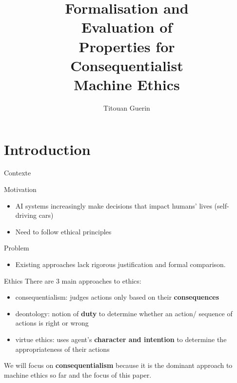 \documentclass[compress,xcolor=table]{beamer}
\title{\Huge Formalisation and\\Evaluation of\\Properties for\\Consequentialist\\Machine Ethics}
\subtitle{} %
\date{\formatdate{16}{05}{2024}}
\author{Titouan Guerin}
\begin{document}
\begin{frame}[plain]
	\titlepage
	\setcounter{framenumber}{0}
\end{frame}

\section{Introduction}

\begin{frame}{Contexte}

    \begin{block}{Motivation}
        \begin{itemize}
            \item AI systems increasingly make decisions that impact humans’ lives (self-driving cars)
            \item Need to follow ethical principles
        \end{itemize}
    \end{block}
    \pause
    \begin{block}{Problem}
        \begin{itemize}
            \item Existing approaches lack rigorous justification and formal comparison.
        \end{itemize}
    \end{block}
\end{frame}

\begin{frame}{Ethics}
    There are 3 main approaches to ethics:
    \pause
    \begin{itemize}
        \item consequentialism: judges actions only based on their \textbf{consequences}
        \item deontology: notion of \textbf{duty} to determine whether an action/ sequence of actions is right or wrong
        \item virtue ethics: uses agent’s \textbf{character and intention} to determine the appropriateness of their actions
    \end{itemize}
    \pause
    \begin{block}{}
        We will focus on \textbf{consequentialism} because it is the dominant approach to machine ethics so far and the focus of this paper.
    \end{block}
\end{frame}
\end{document}
